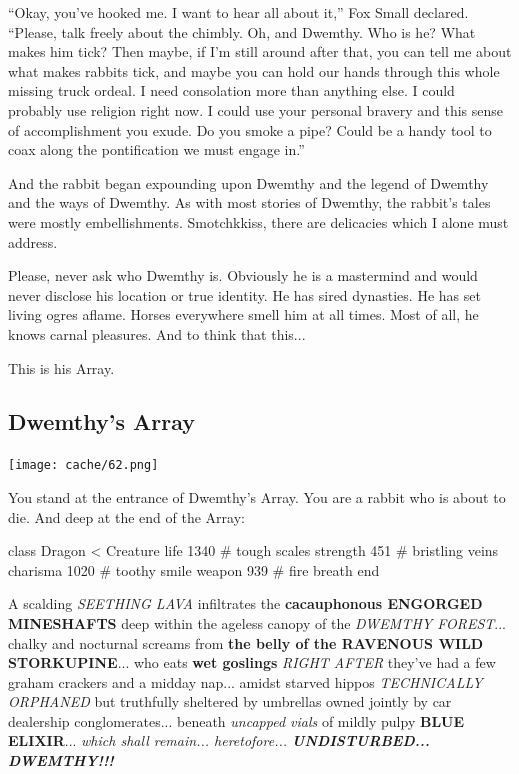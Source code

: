 \documentclass[12pt,twoside]{report}
\begin{document}
``Okay, you've hooked me.  I want to hear all about it,'' Fox Small
declared. ``Please, talk freely about the chimbly.  Oh, and Dwemthy.
Who is he?  What makes him tick?  Then maybe, if I'm still around
after that, you can tell me about what makes rabbits tick, and maybe
you can hold our hands through this whole missing truck ordeal. I need
consolation more than anything else.  I could probably use religion
right now.  I could use your personal bravery and this sense of
accomplishment you exude.  Do you smoke a pipe?  Could be a handy tool
to coax along the pontification we must engage in.''

And the rabbit began expounding upon Dwemthy and the legend of Dwemthy
and the ways of Dwemthy. As with most stories of Dwemthy, the rabbit's
tales were mostly embellishments. Smotchkkiss, there are delicacies
which I alone must address.

Please, never ask who Dwemthy is. Obviously he is a mastermind and
would never disclose his location or true identity. He has sired
dynasties. He has set living ogres aflame. Horses everywhere smell him
at all times. Most of all, he knows carnal pleasures. And to think
that this...

This is his Array.



\subsection{Dwemthy's Array}



	\texttt{[image: cache/62.png]}

You stand at the entrance of Dwemthy's Array.  You are a rabbit who is
about to die. And deep at the end of the Array:


\begin{rubycode}

 class Dragon < Creature
   life 1340     # tough scales
   strength 451  # bristling veins
   charisma 1020 # toothy smile
   weapon 939    # fire breath
 end

\end{rubycode}


A scalding {\em SEETHING LAVA} infiltrates the {\bf cacauphonous
  ENGORGED MINESHAFTS} deep within the ageless canopy of the {\em
  DWEMTHY FOREST}... chalky and nocturnal screams from {\bf the belly
  of the RAVENOUS WILD STORKUPINE}... who eats {\bf wet goslings} {\em
  RIGHT AFTER} they've had a few graham crackers and a midday
nap... amidst starved hippos {\em TECHNICALLY ORPHANED} but truthfully
sheltered by umbrellas owned jointly by car dealership
conglomerates... beneath {\em uncapped vials} of mildly pulpy {\bf
  BLUE ELIXIR}... {\em which shall remain... heretofore... {\bf
    UNDISTURBED... DWEMTHY!!!}}
\end{document}
